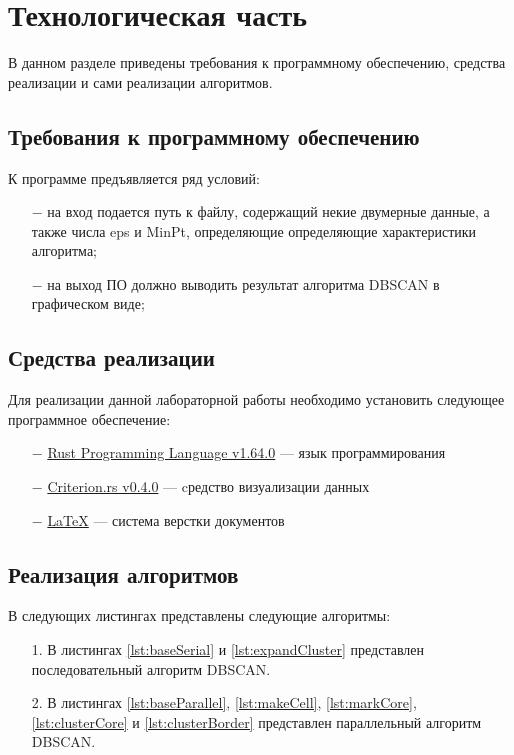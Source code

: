 \chapter{Технологическая часть}

В данном разделе приведены требования к программному обеспечению, средства реализации и сами реализации алгоритмов.

\section{Требования к программному обеспечению}
К программе предъявляется ряд условий:
\begin{itemize}
    \item[$-$] на вход подается путь к файлу, содержащий некие двумерные данные, а также числа eps и MinPt, определяющие определяющие характеристики алгоритма;
    \item[$-$] на выход ПО должно выводить результат алгоритма DBSCAN в графическом виде;
\end{itemize}

\section{Средства реализации}
Для реализации данной лабораторной работы необходимо установить следующее программное обеспечение:
\begin{itemize}
    \item[$-$] \href{https://www.rust-lang.org/}{Rust Programming Language v1.64.0} --- язык программирования~\cite{Rust}
    \item[$-$] \href{https://github.com/bheisler/criterion.rs}{Criterion.rs v0.4.0} --- cредство визуализации данных
    \item[$-$] \href{https://www.latex-project.org/}{LaTeX} --- система верстки документов
\end{itemize}

\section{Реализация алгоритмов}
В следующих листингах представлены следующие алгоритмы:
\begin{itemize}
    \item[1.] В листингах \ref{lst:baseSerial} и \ref{lst:expandCluster} представлен последовательный алгоритм DBSCAN.
    \item[2.] В листингах \ref{lst:baseParallel}, \ref{lst:makeCell}, \ref{lst:markCore}, \ref{lst:clusterCore} и \ref{lst:clusterBorder} представлен параллельный алгоритм DBSCAN.
\end{itemize}
\newpage


